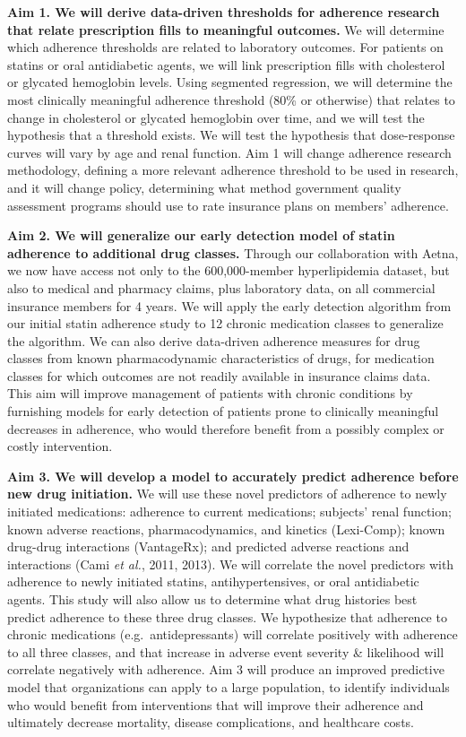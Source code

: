 \documentclass[11pt]{report}
\begin{document}
\textbf{Aim 1. We will derive data-driven thresholds for adherence
  research that relate prescription fills to meaningful outcomes.} We
will determine which adherence thresholds are related to laboratory
outcomes. For patients on statins or oral antidiabetic agents, we will
link prescription fills with cholesterol or glycated hemoglobin
levels. Using segmented regression, we will determine the most
clinically meaningful adherence threshold (80\% or otherwise) that
relates to change in cholesterol or glycated hemoglobin over time, and
we will test the hypothesis that a threshold exists. We will test the
hypothesis that dose-response curves will vary by age and renal
function. Aim 1 will change adherence research methodology, defining a
more relevant adherence threshold to be used in research, and it will
change policy, determining what method government quality assessment
programs should use to rate insurance plans on members' adherence.

\textbf{Aim 2. We will generalize our early detection model of statin
  adherence to additional drug classes.} Through our collaboration
with Aetna, we now have access not only to the 600,000-member
hyperlipidemia dataset, but also to medical and pharmacy claims, plus
laboratory data, on all commercial insurance members for 4 years. We
will apply the early detection algorithm from our initial statin
adherence study to 12 chronic medication classes to generalize the
algorithm. We can also derive data-driven adherence measures for drug
classes from known pharmacodynamic characteristics of drugs, for
medication classes for which outcomes are not readily available in
insurance claims data. This aim will improve management of patients
with chronic conditions by furnishing models for early detection of
patients prone to clinically meaningful decreases in adherence, who
would therefore benefit from a possibly complex or costly
intervention.


\textbf{Aim 3. We will develop a model to accurately predict adherence
  before new drug initiation.} We will use these novel predictors of
adherence to newly initiated medications: adherence to current
medications; subjects' renal function; known adverse reactions,
pharmacodynamics, and kinetics (Lexi-Comp); known drug-drug
interactions (VantageRx); and predicted adverse reactions and
interactions (Cami \emph{et al.}, 2011, 2013). We will correlate the
novel predictors with adherence to newly initiated statins,
antihypertensives, or oral antidiabetic agents. This study will also
allow us to determine what drug histories best predict adherence to
these three drug classes. We hypothesize that adherence to chronic
medications (e.g.\ antidepressants) will correlate positively with
adherence to all three classes, and that increase in adverse event
severity \& likelihood will correlate negatively with adherence. Aim 3
will produce an improved predictive model that organizations can apply
to a large population, to identify individuals who would benefit from
interventions that will improve their adherence and ultimately
decrease mortality, disease complications, and healthcare costs.
\end{document}
